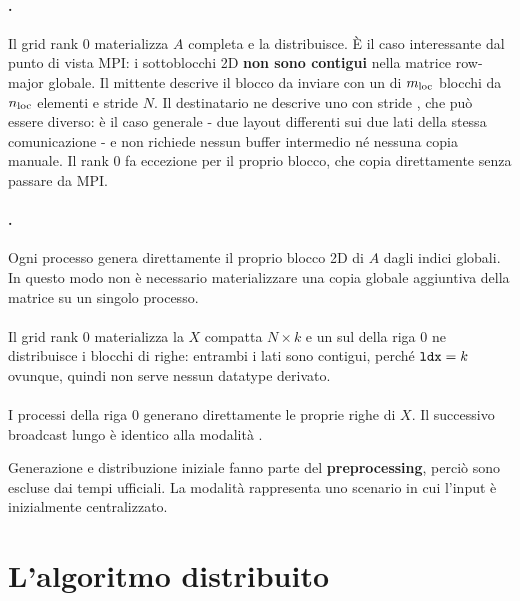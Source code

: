 \paragraph{.} Il grid rank $0$ materializza $A$ completa e
la distribuisce. È il caso interessante dal punto di vista MPI: i sottoblocchi
2D \textbf{non sono contigui} nella matrice row-major globale. Il mittente
descrive il blocco da inviare con un  di $m_{\text{loc}}$ blocchi
da $n_{\text{loc}}$ elementi e stride $N$. Il destinatario ne descrive uno con stride , che può essere diverso:
è il caso generale - due layout differenti sui due lati della stessa
comunicazione - e non richiede nessun buffer intermedio né nessuna copia
manuale. Il rank $0$ fa eccezione per il proprio blocco, che copia
direttamente senza passare da MPI.

\paragraph{.} Ogni processo genera direttamente il proprio blocco 2D di 
$A$ dagli indici globali. In questo modo non è necessario materializzare una copia globale
aggiuntiva della matrice su un singolo processo.


\paragraph{} Il
grid rank $0$ materializza la $X$ compatta $N \times k$ e un
 sul  della riga $0$ ne distribuisce i blocchi di righe:
entrambi i lati sono contigui, perché $\texttt{ldx} = k$ ovunque, quindi non
serve nessun datatype derivato. 

\paragraph{} I processi
della riga $0$ generano direttamente le proprie righe di $X$. Il successivo broadcast lungo 
è identico alla modalità .

\medskip

Generazione e distribuzione iniziale fanno parte del \textbf{preprocessing},
perciò sono escluse dai tempi ufficiali.
La modalità  rappresenta uno scenario in cui l'input è inizialmente centralizzato.

\section{L'algoritmo distribuito}

